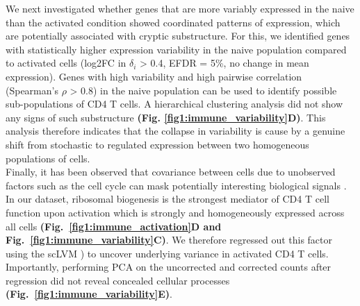 We next investigated whether genes that are more variably expressed in the naive than the activated condition showed coordinated patterns of expression, which are potentially associated with cryptic substructure. 
For this, we identified genes with statistically higher expression variability in the naive population compared to activated cells (log2FC in $\delta_i$ > 0.4, EFDR = 5\%, no change in mean expression). 
Genes with high variability and high pairwise correlation (Spearman’s $\rho$ > 0.8) in the naive population can be used to identify possible sub-populations of CD4\plus{} T cells. 
A hierarchical clustering analysis did not show any signs of such substructure \textbf{(Fig. \ref{fig1:immune_variability}D)}. 
This analysis therefore indicates that the collapse in variability is cause by a genuine shift from stochastic to regulated expression between two homogeneous populations of cells.\\

Finally, it has been observed that covariance between cells due to unobserved factors such as the cell cycle can mask potentially interesting biological signals \citep{Stegle2015, Buettner2015}. 
In our dataset, ribosomal biogenesis is the strongest mediator of CD4\plus{} T cell function upon activation which is strongly and homogeneously expressed across all cells \textbf{(Fig.~\ref{fig1:immune_activation}D and Fig.~\ref{fig1:immune_variability}C)}. We therefore regressed out this factor using the \gls{scLVM} \citep{Buettner2015}) to uncover underlying variance in activated CD4\plus{} T cells. 
Importantly, performing PCA on the uncorrected and corrected counts after regression did not reveal concealed cellular processes \textbf{(Fig.~\ref{fig1:immune_variability}E)}.\\

\newpage


